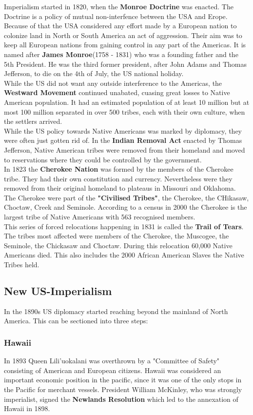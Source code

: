 \documentclass{article}
\begin{document}
	Imperialism started in 1820, when the \textbf{Monroe Doctrine} was enacted. The Doctrine is a policy of mutual non-interfence between the USA and Erope. Because of that the USA considered any effort made by a European nation to colonize land in North or South America an act of aggression. Their aim was to keep all European nations from gaining control in any part of the Americas. It is named after \textbf{James Monroe}(1758 - 1831) who was a founding father and the 5th President. He was the third former president, after John Adams and Thomas Jefferson, to die on the 4th of July, the US national holiday. \\
	While the US did not want any outside interference to the Americas, the \textbf{Westward Movement} continued unabated, cuasing great losses to Native American population. It had an estimated population of at least 10 million but at most 100 million separated in over 500 tribes, each with their own culture, when the settlers arrived. \\
	While the US policy towards Native Americans was marked by diplomacy, they were often just gotten rid of. In the \textbf{Indian Removal Act} enacted by Thomas Jefferson, Native American tribes were removed from their homeland and moved to reservations where they could be controlled by the government. \\
	In 1823 the \textbf{Cherokee Nation} was formed by the members of the Cherokee tribe. They had their own constitution and currency. Nevertheless were they removed from their original homeland to plateaus in Missouri and Oklahoma. The Cherokee were part of the \textbf{"Civilised Tribes"}, the Cherokee, the CHikasaw, Choctaw, Creek and Seminole. According to a census in 2000 the Cherokee is the largest tribe of Native Americans with 563 recognised members. \\
	This series of forced relocations happening in 1831 is called the \textbf{Trail of Tears}. The tribes most affected were members of the Cherokee, the Muscogee, the Seminole, the Chickasaw and Choctaw. During this relocation 60,000 Native Americans died. This also includes the 2000 African American Slaves the Native Tribes held. \\
	\subsection{New US-Imperialism}
	In the 1890s US diplomacy started reaching beyond the mainland of North America. This can be sectioned into three steps:
	\subsubsection{Hawaii}
	In 1893 Queen Lili'uokalani was overthrown by a "Committee of Safety" consisting of American and European citizens. Hawaii was considered an important economic position in the pacific, since it was one of the only stops in the Pacific for merchant vessels.
	President William McKinley, who was strongly imperialist, signed the \textbf{Newlands Resolution} which led to the annexation of Hawaii in 1898.
\end{document}
